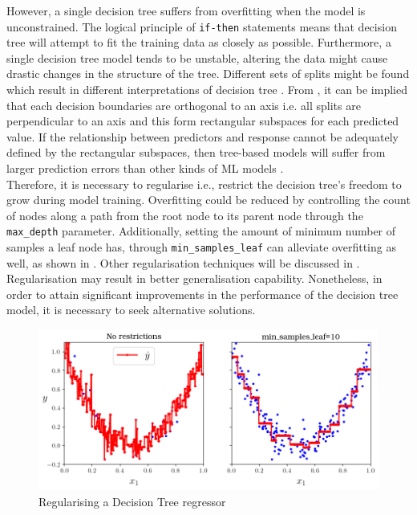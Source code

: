 However, a single decision tree suffers from overfitting when the model is unconstrained. The logical principle of {\tt if-then} statements means that decision tree will attempt to fit the training data as closely as possible. Furthermore, a single decision tree model tends to be unstable, altering the data might cause drastic changes in the structure of the tree. Different sets of splits might be found which result in different interpretations of decision tree . From , it can be implied that each decision boundaries are orthogonal to an axis i.e. all splits are perpendicular to an axis and this form rectangular subspaces for each predicted value. If the relationship between predictors and response cannot be adequately defined by the rectangular subspaces, then tree-based models will suffer from larger prediction errors than other kinds of ML models .\\

Therefore, it is necessary to regularise i.e., restrict the decision tree's freedom to grow during model training. Overfitting could be reduced by controlling the count of nodes along a path from the root node to its parent node through the {\tt max\_depth} parameter. Additionally, setting the amount of minimum number of samples a leaf node has, through {\tt min\_samples\_leaf} can alleviate overfitting as well, as shown in . Other regularisation techniques will be discussed in . Regularisation may result in better generalisation capability. Nonetheless, in order to attain significant improvements in the performance of the decision tree model, it is necessary to seek alternative solutions.\\

\begin{figure}
    \centering
        \includegraphics[width=.9\textwidth]{02_figures/fig6_6_paramdepth_geron09.png}
        \caption{Regularising a Decision Tree regressor }
        \label{fig:geron6_6}
\end{figure}

